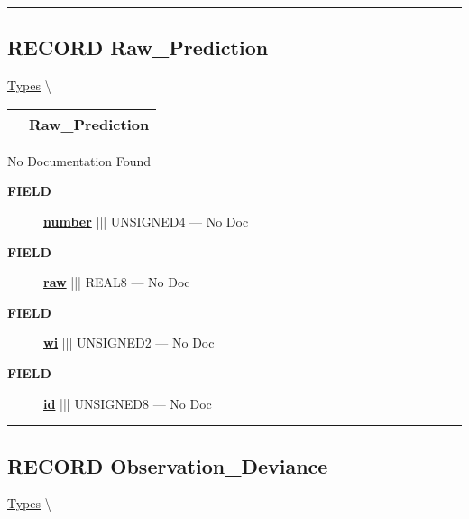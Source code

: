 \rule{\linewidth}{0.5pt}
\subsection*{\textsf{\colorbox{headtoc}{\color{white} RECORD}
Raw\_Prediction}}

\hypertarget{ecldoc:logisticregression.types.raw_prediction}{}
\hspace{0pt} \hyperlink{ecldoc:LogisticRegression.Types}{Types} \textbackslash 

{\renewcommand{\arraystretch}{1.5}
\begin{tabularx}{\textwidth}{|>{\raggedright\arraybackslash}l|X|}
\hline
\hspace{0pt}\mytexttt{\color{red} } & \textbf{Raw\_Prediction} \\
\hline
\end{tabularx}
}

\par





No Documentation Found







\par
\begin{description}
\item [\colorbox{tagtype}{\color{white} \textbf{\textsf{FIELD}}}] \textbf{\underline{number}} ||| UNSIGNED4 --- No Doc
\item [\colorbox{tagtype}{\color{white} \textbf{\textsf{FIELD}}}] \textbf{\underline{raw}} ||| REAL8 --- No Doc
\item [\colorbox{tagtype}{\color{white} \textbf{\textsf{FIELD}}}] \textbf{\underline{wi}} ||| UNSIGNED2 --- No Doc
\item [\colorbox{tagtype}{\color{white} \textbf{\textsf{FIELD}}}] \textbf{\underline{id}} ||| UNSIGNED8 --- No Doc
\end{description}





\rule{\linewidth}{0.5pt}
\subsection*{\textsf{\colorbox{headtoc}{\color{white} RECORD}
Observation\_Deviance}}

\hypertarget{ecldoc:logisticregression.types.observation_deviance}{}
\hspace{0pt} \hyperlink{ecldoc:LogisticRegression.Types}{Types} \textbackslash 

